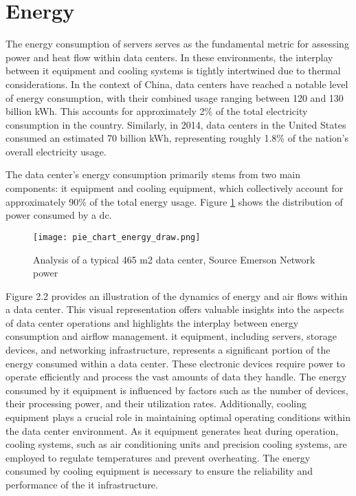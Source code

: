 \documentclass[
  a4paper,  %
  twoside,  %
  bibliography=totoc,
  headsepline,
  cleardoublepage=empty,
  parskip=half,
  draft=false
]{scrbook}
\begin{document}
\section{Energy}
The energy consumption of servers serves as the fundamental metric for assessing power and heat flow within data centers. In these environments, the interplay between \gls{it} equipment and cooling systems is tightly intertwined due to thermal considerations. In the context of China, data centers have reached a notable level of energy consumption, with their combined usage ranging between 120 and 130 billion kWh. This accounts for approximately 2\% of the total electricity consumption in the country. Similarly, in 2014, data centers in the United States consumed an estimated 70 billion kWh, representing roughly 1.8\% of the nation's overall electricity usage\cite{JIN2020114806}. 


The data center's energy consumption primarily stems from two main components: \gls{it} equipment and cooling equipment, which collectively account for approximately 90\% of the total energy usage\cite{JIN2020114806}. Figure \ref{power_draw} shows the distribution of power consumed by a \gls{dc}.

\begin{figure}
	\centering
	\texttt{[image: pie\_chart\_energy\_draw.png]}
	\caption{Analysis of a typical 465 m2 data center, Source Emerson Network power\cite{emerson2015}}
	\label{power_draw}
\end{figure}


 Figure 2.2 provides an illustration of the dynamics of energy and air flows within a data center. This visual representation offers valuable insights into the aspects of data center operations and highlights the interplay between energy consumption and airflow management. \gls{it} equipment, including servers, storage devices, and networking infrastructure, represents a significant portion of the energy consumed within a data center. These electronic devices require power to operate efficiently and process the vast amounts of data they handle. The energy consumed by \gls{it} equipment is influenced by factors such as the number of devices, their processing power, and their utilization rates\cite{von2016variations}. Additionally, cooling equipment plays a crucial role in maintaining optimal operating conditions within the data center environment. As \gls{it} equipment generates heat during operation, cooling systems, such as air conditioning units and precision cooling systems, are employed to regulate temperatures and prevent overheating. The energy consumed by cooling equipment is necessary to ensure the reliability and performance of the \gls{it} infrastructure\cite{rong2016optimizing}.
\end{document}
